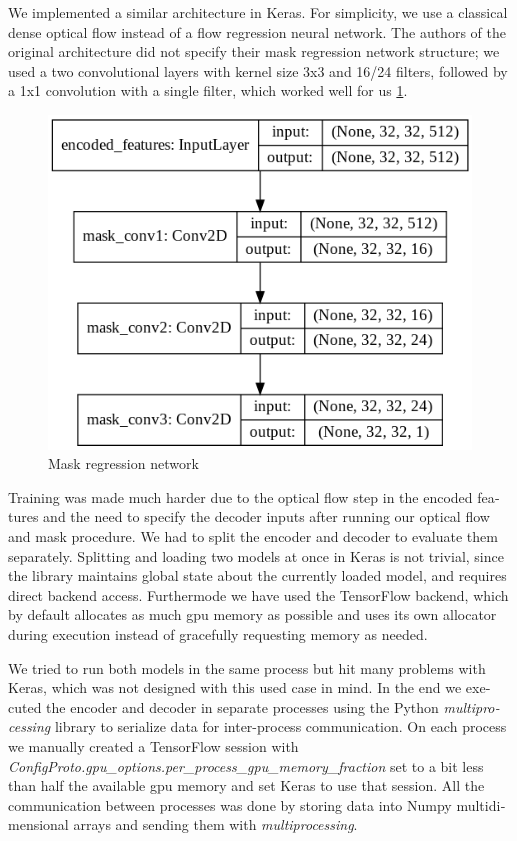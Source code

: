 \documentclass[12pt,openright,oneside,a4paper,english]{abntex2}
\begin{document}
\begin{otherlanguage}{english}
    We implemented a similar architecture in Keras. For simplicity, we use a classical dense optical flow instead of a flow regression neural network. The authors of the original architecture did not specify their mask regression network structure; we used a two convolutional layers with kernel size 3x3 and 16/24 filters, followed by a 1x1 convolution with a single filter, which worked well for us \ref{mask_net}.

    \begin{figure}[!htb]
    \centering
    \includegraphics[width=\textwidth/2]{mask_network}
    \caption{Mask regression network}
    \label{mask_net}
    \end{figure}

    Training was made much harder due to the optical flow step in the encoded features and the need to specify the decoder inputs after running our optical flow and mask procedure. We had to split the encoder and decoder to evaluate them separately. Splitting and loading two models at once in Keras is not trivial, since the library maintains global state about the currently loaded model, and requires direct backend access. Furthermode we have used the TensorFlow backend, which by default allocates as much \acrshort{gpu} memory as possible and uses its own allocator during execution instead of gracefully requesting memory as needed.

    We tried to run both models in the same process but hit many problems with Keras, which was not designed with this used case in mind. In the end we executed the encoder and decoder in separate processes using the Python \textit{multiprocessing} library to serialize data for inter-process communication. On each process we manually created a TensorFlow session with \textit{ConfigProto.gpu\_options.per\_process\_gpu\_memory\_fraction} set to a bit less than half the available \acrshort{gpu} memory and set Keras to use that session. All the communication between processes was done by storing data into Numpy multidimensional arrays and sending them with \textit{multiprocessing}.


\end{otherlanguage}
\end{document}
